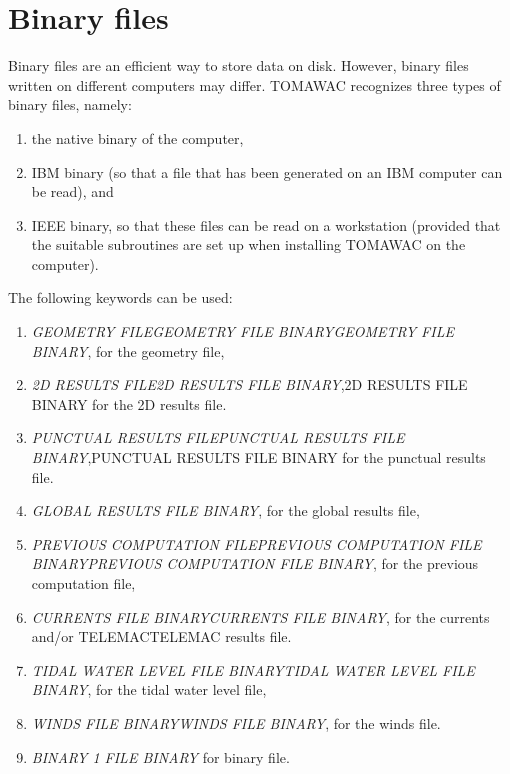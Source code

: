 \section{ Binary files }

 Binary files are an efficient way to store data on disk. However, binary files written on different computers may differ. TOMAWAC recognizes three types of binary files, namely:

\begin{enumerate}
\item  the native binary of the computer,

\item  IBM binary (so that a file that has been generated on an IBM computer can be read), and

\item  IEEE binary, so that these files can be read on a workstation (provided that the suitable subroutines are set up when installing TOMAWAC on the computer).
\end{enumerate}

 The following keywords can be used:

\begin{enumerate}
\item  \textit{GEOMETRY FILEGEOMETRY FILE BINARYGEOMETRY FILE BINARY}, for the geometry file,

\item  \textit{2D RESULTS FILE2D RESULTS FILE BINARY},2D RESULTS FILE BINARY for the 2D results file.

\item  \textit{PUNCTUAL RESULTS FILEPUNCTUAL RESULTS FILE BINARY},PUNCTUAL RESULTS FILE BINARY for the punctual results file.

\item  \textit{GLOBAL RESULTS FILE BINARY}, for the global results file,

\item  \textit{PREVIOUS COMPUTATION FILEPREVIOUS COMPUTATION FILE BINARYPREVIOUS COMPUTATION FILE BINARY}, for the previous computation file,

\item  \textit{CURRENTS FILE BINARYCURRENTS FILE BINARY}, for the currents and/or TELEMACTELEMAC results file.

\item  \textit{TIDAL WATER LEVEL FILE BINARYTIDAL WATER LEVEL FILE BINARY}, for the tidal water level file,

\item  \textit{WINDS FILE BINARYWINDS FILE BINARY}, for the winds file.

\item  \textit{BINARY 1 FILE BINARY }for binary file.
\end{enumerate}

